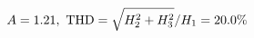 \documentclass[preview]{standalone}
\begin{document}
\begin{align*}
\special{dvisvgm:raw <g id='unique000'>}A=1.21,\ \text{THD}=\sqrt{H_2^2+H_3^2}/H_1=20.0\%\special{dvisvgm:raw </g>}
\end{align*}
\end{document}
